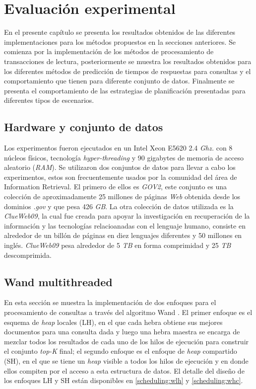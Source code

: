 \chapter{Evaluación experimental}
\label{cap:evaluacionexperimental}
En el presente capítulo se presenta los resultados obtenidos de las diferentes implementaciones para los métodos propuestos en la secciones anteriores. Se comienza por la implementación de los métodos de procesamiento de transacciones de lectura, posteriormente se muestra los resultados obtenidos para los diferentes métodos de predicción de tiempos de respuestas para consultas y el comportamiento que tienen para diferente conjunto de datos. Finalmente se presenta el comportamiento de las estrategias de planificación presentadas para diferentes tipos de escenarios.

\section{Hardware y conjunto de datos}
\label{evaluacionexperimental:hardwareydatos}
Los experimentos fueron ejecutados en un Intel Xeon E5620 2.4 \textit{Ghz.} con 8 núcleos físicos, tecnología \textit{hyper-threading} y 90 gigabytes de memoria de acceso aleatorio (\textit{RAM}). Se utilizaron dos conjuntos de datos para llevar a cabo los experimentos, estos son frecuentemente usados por la comunidad del área de Information Retrieval. El primero de ellos es \textit{GOV2}, este conjunto es una colección de aproximadamente 25 millones de páginas \textit{Web} obtenida desde los dominios \textit{.gov} y que pesa 426 \textit{GB}. La otra colección de datos utilizada es la \textit{ClueWeb09}, la cual fue creada para apoyar la investigación en recuperación de la información y las tecnologías relacioanadas con el lenguaje humano, consiste en alrededor de un billón de páginas en diez lenguajes diferentes y 50 millones en inglés. \textit{ClueWeb09} pesa alrededor de 5 \textit{TB} en forma comprimidad y 25 \textit{TB} descomprimida. 

\section{Wand multithreaded}
\label{evaluacionexperimental:wm}
En esta sección se muestra la implementación de dos enfoques para el procesamiento de consultas a través del algoritmo Wand \citep{Broder:2003}. El primer enfoque es el esquema de \textit{heap} locales (LH), en el que cada hebra obtiene sus mejores documentos para una consulta dada y luego una hebra maestra se encarga de mezclar todos los resultados de cada uno de los hilos de ejecución para construir el conjunto \textit{top-K} final; el segundo enfoque es el enfoque de \textit{heap} compartido (SH), en el que se tiene un \textit{heap} visible a todos los hilos de ejecución y en donde ellos compiten por el acceso a esta estructura de datos. El detalle del diseño de los enfoques LH y SH están disponibles en \ref{scheduling:wlh} y \ref{scheduling:whc}. 


